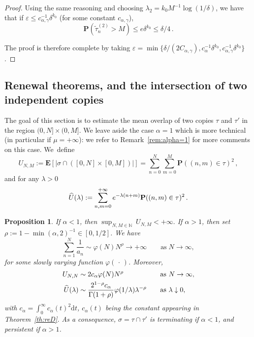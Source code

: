 \documentclass[11pt]{article}
\newtheorem{prop}[theo]{Proposition}
\theoremstyle{definition}
\numberwithin{equation}{section}
\numberwithin{figure}{section}
\numberwithin{table}{section}
\newcommand{\ga}{\alpha}
\newcommand{\gd}{\delta}
\newcommand{\gep}{\varepsilon}
\newcommand{\gl}{\lambda}
\newcommand{\dd}{\mathrm{d}}
\renewcommand{\tilde}{\widetilde}
\let\oldhat\hat
\renewcommand*{\hat}[1]{\mathchoice{\widehat{#1}}{\widehat{#1}}{\oldhat{#1}}{\oldhat{#1}}}
\newcommand{\bP}{\ensuremath{\mathbf{P}}}
\newcommand{\bE}{\ensuremath{\mathbf{E}}}
\newcommand{\bbN}{\ensuremath{\mathbb{N}}}
\begin{document}
\begin{appendix}
\begin{proof}
Using the same reasoning and choosing $\lambda_2 = k_0 M^{-1} \log (1/\delta)$, we have that if $\gep\leq c_{\ga,\gamma}^{-1} \gd^{k_0}$ (for some constant $c_{\ga,\gamma}$),
\begin{equation}
\bP(\tilde{\tau}^{(2)}_n > M) \le e \delta^{k_0} \leq \gd/4\,.
\end{equation}

The proof is therefore complete by taking $\gep = \min \lbrace \delta / (2 C_{\ga,\gamma}), c_{\ga}^{-1} \delta^{k_0}, c_{\ga,\gamma}^{-1} \delta^{k_0} \rbrace$.
\end{proof}

\subsection{Renewal theorems, and the intersection of two independent copies}

The goal of this section is to estimate the mean overlap of two copies $\tau$ and $\tau'$ in the region $(0,N]\times (0,M]$. We leave aside the case $\ga=1$ which is more technical (in particular if $\mu=+\infty$): we refer to Remark~\ref{rem:alpha=1} for more comments on this case. We~define
\begin{equation}\label{eq:UNM}
U_{N,M}:= \bE\left[\left| \sigma\cap \left([0,N]\times [0,M]\right) \right|\right] =\sum_{n=0}^{N} \sum_{m=0}^{M} \bP((n,m)\in\tau)^2\,,
\end{equation}
and for any $\gl>0$
\begin{equation}
\hat U (\gl) := \sum_{n,m=0}^{+\infty} e^{-\gl (n+m)} \bP((n,m)\in\tau)^2\,.
\end{equation}

\begin{prop}\label{prop:transience}
If $\ga<1$, then $\sup_{N,M\in\bbN} \ U_{N,M} <+\infty.$ If $\ga>1$, then set $\rho:=1-\min(\ga,2)^{-1} \in [0,1/2]$. We have
\begin{equation}\label{suman}
\sum_{n=1}^N \frac{1}{a_n} \sim \varphi(N) N^{\rho} \to +\infty \qquad \text{as}\;N\to\infty,
\end{equation}
for some slowly varying function $ \varphi ({\,\cdot\,})$. Moreover,
\begin{equation}\label{eq:asympUn}
\begin{aligned}
U_{N,N}&\sim 2 c_{\ga} \varphi(N) N^{\rho} &&\quad \text{as } N\to\infty, \\
\hat U(\gl) & \sim \frac{2^{1-\rho} c_{\ga}}{\Gamma(1+\rho)} \varphi(1/\gl) \gl^{-\rho} &&\quad \text{as } \gl\downarrow 0,
\end{aligned}
\end{equation}
with $c_{\ga} = \int_{0}^{\infty} c_{\ga}(t)^2 \dd t$, $c_{\ga}(t)$ being the constant appearing in Theorem~\ref{th:reD}.
As a consequence, $\sigma=\tau\cap\tau'$ is terminating if $\ga<1$, and persistent if $\ga> 1$.
\end{prop}


\end{appendix}
\end{document}
